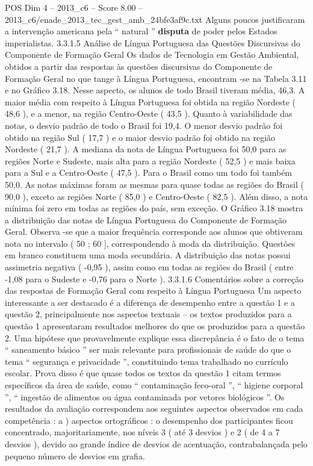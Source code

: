 \begin{textsample}{POS Dim 4 – 2013\_c6 – Score 8.00 – 2013\_c6/enade\_2013\_tec\_gest\_amb\_24bfe3af9c.txt}
Alguns poucos justificaram a intervenção americana pela “ natural ” \textbf{disputa} de poder pelos Estados imperialistas. 3.3.1.5 Análise de Língua Portuguesa das Questões Discursivas do Componente de Formação Geral Os dados de Tecnologia em Gestão Ambiental, obtidos a partir das respostas às questões discursivas do Componente de Formação Geral no que tange à Língua Portuguesa, encontram -se na Tabela 3.11 e no Gráfico 3.18.
Nesse aspecto, os alunos de todo Brasil tiveram média, 46,3.
A maior média com respeito à Língua Portuguesa foi obtida na região Nordeste ( 48,6 ), e a menor, na região Centro-Oeste ( 43,5 ).
Quanto à variabilidade das notas, o desvio padrão de todo o Brasil foi 19,4.
O menor desvio padrão foi obtido na região Sul ( 17,7 ) e o maior desvio padrão foi obtido na região Nordeste ( 21,7 ).
A mediana da nota de Língua Portuguesa foi 50,0 para as regiões Norte e Sudeste, mais alta para a região Nordeste ( 52,5 ) e mais baixa para a Sul e a Centro-Oeste ( 47,5 ).
Para o Brasil como um todo foi também 50,0.
As notas máximas foram as mesmas para quase todas as regiões do Brasil ( 90,0 ), exceto as regiões Norte ( 85,0 ) e Centro-Oeste ( 82,5 ).
Além disso, a nota mínima foi zero em todas as regiões do país, sem exceção.
O Gráfico 3.18 mostra a distribuição das notas de Língua Portuguesa do Componente de Formação Geral.
Observa -se que a maior frequência corresponde aos alunos que obtiveram nota no intervalo ( 50 ; 60 ], correspondendo à moda da distribuição.
Questões em branco constituem uma moda secundária.
A distribuição das notas possui assimetria negativa ( -0,95 ), assim como em todas as regiões do Brasil ( entre -1,08 para o Sudeste e -0,76 para o Norte ). 3.3.1.6 Comentários sobre a correção das respostas de Formação Geral com respeito à Língua Portuguesa Um aspecto interessante a ser destacado é a diferença de desempenho entre a questão 1 e a questão 2, principalmente nos aspectos textuais – os textos produzidos para a questão 1 apresentaram resultados melhores do que os produzidos para a questão 2.
Uma hipótese que provavelmente explique essa discrepância é o fato de o tema “ saneamento básico ” ser mais relevante para profissionais de saúde do que o tema “ segurança e privacidade ”, constituindo tema trabalhado no currículo escolar.
Prova disso é que quase todos os textos da questão 1 citam termos específicos da área de saúde, como “ contaminação feco-oral ”, “ higiene corporal ”, “ ingestão de alimentos ou água contaminada por vetores biológicos ”.
Os resultados da avaliação correspondem aos seguintes aspectos observados em cada competência : a ) aspectos ortográficos : o desempenho dos participantes ficou concentrado, majoritariamente, nos níveis 3 ( até 3 desvios ) e 2 ( de 4 a 7 desvios ), devido ao grande índice de desvios de acentuação, contrabalançada pelo pequeno número de desvios em grafia.

\end{textsample}
